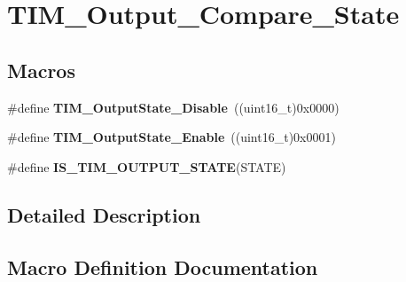 \hypertarget{group___t_i_m___output___compare___state}{}\section{T\+I\+M\+\_\+\+Output\+\_\+\+Compare\+\_\+\+State}
\label{group___t_i_m___output___compare___state}
\subsection*{Macros}
\begin{DoxyCompactItemize}
\item 
\hypertarget{group___t_i_m___output___compare___state_ga4ad0f484cfa16b5190654da8278940d0}{}\#define {\bfseries T\+I\+M\+\_\+\+Output\+State\+\_\+\+Disable}~((uint16\+\_\+t)0x0000)\label{group___t_i_m___output___compare___state_ga4ad0f484cfa16b5190654da8278940d0}

\item 
\hypertarget{group___t_i_m___output___compare___state_ga65afdda8761b6ac5ed0c0ad67c05dffe}{}\#define {\bfseries T\+I\+M\+\_\+\+Output\+State\+\_\+\+Enable}~((uint16\+\_\+t)0x0001)\label{group___t_i_m___output___compare___state_ga65afdda8761b6ac5ed0c0ad67c05dffe}

\item 
\#define {\bfseries I\+S\+\_\+\+T\+I\+M\+\_\+\+O\+U\+T\+P\+U\+T\+\_\+\+S\+T\+A\+T\+E}(S\+T\+A\+T\+E)
\end{DoxyCompactItemize}


\subsection{Detailed Description}


\subsection{Macro Definition Documentation}
\hypertarget{group___t_i_m___output___compare___state_ga5848617f830d2de688eaff50ed279679}{}

